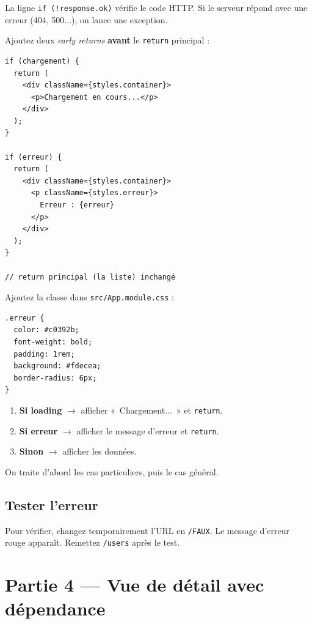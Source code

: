 \documentclass[11pt,a4paper]{article}
\begin{document}
La ligne \texttt{if (!response.ok)} vérifie le code HTTP. Si le serveur répond avec une erreur (404, 500...), on lance une exception.

Ajoutez deux \emph{early returns} \textbf{avant} le \texttt{return} principal :

\begin{lstlisting}
if (chargement) {
  return (
    <div className={styles.container}>
      <p>Chargement en cours...</p>
    </div>
  );
}

if (erreur) {
  return (
    <div className={styles.container}>
      <p className={styles.erreur}>
        Erreur : {erreur}
      </p>
    </div>
  );
}

// return principal (la liste) inchangé
\end{lstlisting}

Ajoutez la classe dans \texttt{src/App.module.css} :

\begin{lstlisting}[style=css]
.erreur {
  color: #c0392b;
  font-weight: bold;
  padding: 1rem;
  background: #fdecea;
  border-radius: 6px;
}
\end{lstlisting}

\begin{retenirbox}
\begin{enumerate}[nosep]
\item \textbf{Si loading} $\to$ afficher «~Chargement...~» et \texttt{return}.
\item \textbf{Si erreur} $\to$ afficher le message d'erreur et \texttt{return}.
\item \textbf{Sinon} $\to$ afficher les données.
\end{enumerate}
On traite d'abord les cas particuliers, puis le cas général.
\end{retenirbox}

\subsection{Tester l'erreur}

Pour vérifier, changez temporairement l'URL en \texttt{/FAUX}. Le message d'erreur rouge apparaît. Remettez \texttt{/users} après le test.

\section{Partie 4 --- Vue de détail avec dépendance}
\end{document}
